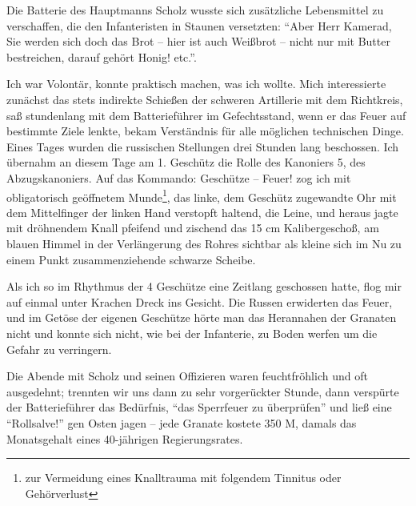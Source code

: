 Die Batterie des Hauptmanns Scholz wusste sich zusätzliche Lebensmittel zu verschaffen, die den Infanteristen in Staunen versetzten: \enquote{Aber Herr Kamerad, Sie werden sich doch das Brot -- hier ist auch Weißbrot -- nicht nur mit Butter bestreichen, darauf gehört Honig! etc.}.

Ich war Volontär, konnte praktisch machen, was ich wollte. Mich interessierte zunächst das stets indirekte Schießen der schweren Artillerie mit dem Richtkreis, saß stundenlang mit dem Batterieführer im Gefechtsstand, wenn er das Feuer auf bestimmte Ziele lenkte, bekam Verständnis für alle möglichen technischen Dinge. Eines Tages wurden die russischen Stellungen drei Stunden lang beschossen. Ich übernahm an diesem Tage am 1. Geschütz die Rolle des Kanoniers 5, des Abzugskanoniers. Auf das Kommando: Geschütze -- Feuer! zog ich mit obligatorisch geöffnetem Munde\footnote{zur Vermeidung eines Knalltrauma mit folgendem Tinnitus oder Gehörverlust}, das linke, dem Geschütz zugewandte Ohr mit dem Mittelfinger der linken Hand verstopft haltend, die Leine, und heraus jagte mit dröhnendem Knall pfeifend und zischend das 15 cm Kalibergeschoß, am blauen Himmel in der Verlängerung des Rohres sichtbar als kleine sich im Nu zu einem Punkt zusammenziehende schwarze Scheibe.

Als ich so im Rhythmus der 4 Geschütze eine Zeitlang geschossen hatte, flog mir auf einmal unter Krachen Dreck ins Gesicht. Die Russen erwiderten das Feuer, und im Getöse der eigenen Geschütze hörte man das Herannahen der Granaten nicht und konnte sich nicht, wie bei der Infanterie, zu Boden werfen um die Gefahr zu verringern.

Die Abende mit Scholz und seinen Offizieren waren feuchtfröhlich und oft ausgedehnt; trennten wir uns dann zu sehr vorgerückter Stunde, dann verspürte der Batterieführer das Bedürfnis, \enquote{das Sperrfeuer zu überprüfen} und ließ eine \enquote{Rollsalve!} gen Osten jagen -- jede Granate kostete 350 M, damals das Monatsgehalt eines 40-jährigen Regierungsrates.

